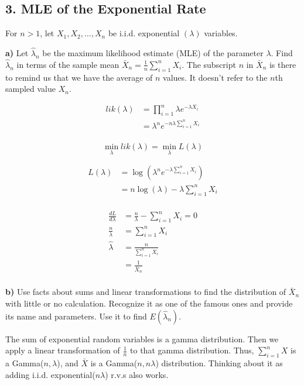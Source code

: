 \documentclass[11pt]{article}
\begin{document}
    \newpage

    \hypertarget{mle-of-the-exponential-rate}{%
\subsection{3. MLE of the Exponential
Rate}\label{mle-of-the-exponential-rate}}

For \(n > 1\), let \(X_1, X_2, \ldots , X_n\) be i.i.d. exponential
\((\lambda )\) variables.

\textbf{a)} Let \(\hat{\lambda}_n\) be the maximum likelihood estimate
(MLE) of the parameter \(\lambda\). Find \(\hat{\lambda}_n\) in terms of
the sample mean \(\bar{X}_n = \frac{1}{n} \sum_{i=1}^n X_i\). The
subscript \(n\) in \(\bar{X}_n\) is there to remind us that we have the
average of \(n\) values. It doesn't refer to the \(n\)th sampled value
\(X_n\).


\begin{align*}
	lik(\lambda) &= \prod_{i=1}^{n}\lambda e^{-\lambda X_{i}} \\
	&= \lambda^{n} e^{-n\lambda\sum_{i=1}^{n}X_{i}}\\
\end{align*}

$$ \min_{\lambda} lik(\lambda) = \min_{\lambda} L(\lambda)$$ 

\begin{align*}
	L(\lambda) &=\log( \lambda^{n}e^{-\lambda \sum_{i=1}^{n} X_{i}}) \\
&= n\log(\lambda) - \lambda \sum_{i=1}^{n}X_{i} \\
\end{align*}


\begin{align*}
\frac{dL}{d\lambda} &= \frac{n}{\lambda} -  \sum_{i=1}^{n}X_{i} = 0\\ 
\frac{n}{\lambda} &= \sum_{i=1}^{n}X_{i} \\
\hat \lambda &=  \frac{n}{\sum_{i=1}^{n}X_{i}}  \\
&= \frac{1}{\bar X_{n}} \\
\end{align*}



\textbf{b)} Use facts about sums and linear transformations to find the
distribution of \(\bar{X}_n\) with little or no calculation. Recognize
it as one of the famous ones and provide its name and parameters. Use it
to find \(E(\hat{\lambda}_n)\).

The sum of exponential random variables is a gamma distribution. Then we apply a linear transformation of $\frac{1}{n}$ to that gamma distribution. Thus, $\sum_{i=1}^{n}X$ is a Gamma($n, \lambda$), and $\bar X$ is a Gamma($n, n\lambda$) distribution. Thinking about it as adding i.i.d. exponential($n\lambda$) r.v.s also works.  
\end{document}
